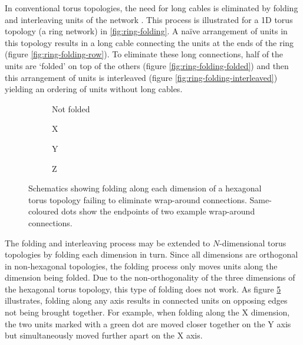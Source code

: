 		In conventional torus topologies, the need for long cables is eliminated by
		folding and interleaving units of the network \cite{dally04}. This process
		is illustrated for a 1D torus topology (a ring network) in
		\ref{fig:ring-folding}. A na\"ive arrangement of units in this topology
		results in a long cable connecting the units at the ends of the ring
		(figure \ref{fig:ring-folding-row}).  To eliminate these long connections,
		half of the units are `folded' on top of the others (figure
		\ref{fig:ring-folding-folded}) and then this arrangement of units is
		interleaved (figure \ref{fig:ring-folding-interleaved}) yielding an
		ordering of units without long cables.
		
		\begin{figure}
			\center
			\begin{subfigure}[b]{0.24\linewidth}
				\center
				\caption{Not folded}
				\label{fig:failing-to-fold-hex-toruses-none}
			\end{subfigure}
			\begin{subfigure}[b]{0.24\linewidth}
				\center
				\caption{X}
				\label{fig:failing-to-fold-hex-toruses-x}
			\end{subfigure}
			\begin{subfigure}[b]{0.24\linewidth}
				\center
				\caption{Y}
				\label{fig:failing-to-fold-hex-toruses-y}
			\end{subfigure}
			\begin{subfigure}[b]{0.24\linewidth}
				\center
				\caption{Z}
				\label{fig:failing-to-fold-hex-toruses-z}
			\end{subfigure}
			
			\caption{Schematics showing folding along each dimension of a hexagonal
			torus topology failing to eliminate wrap-around connections.
			Same-coloured dots show the endpoints of two example wrap-around
			connections.}
			\label{fig:failing-to-fold-hex-toruses}
		\end{figure}
		
		The folding and interleaving process may be extended to $N$-dimensional
		torus topologies by folding each dimension in turn. Since all dimensions
		are orthogonal in non-hexagonal topologies, the folding process only moves
		units along the dimension being folded. Due to the non-orthogonality of the
		three dimensions of the hexagonal torus topology, this type of folding does
		not work. As figure \ref{fig:failing-to-fold-hex-toruses} illustrates,
		folding along any axis results in connected units on opposing edges not
		being brought together. For example, when folding along the X dimension,
		the two units marked with a green dot are moved closer together on the Y
		axis but simultaneously moved further apart on the X axis.
	

